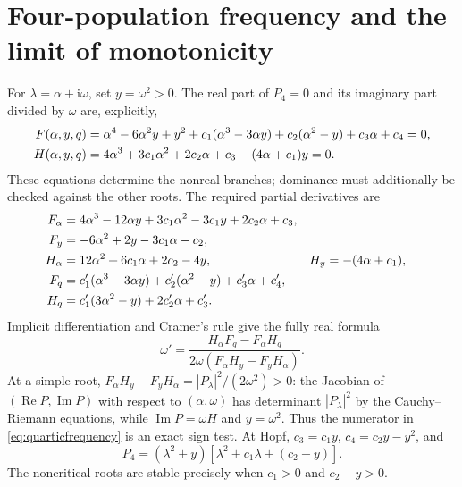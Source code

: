 \documentclass[11pt]{article}
\newcommand{\ii}{\mathrm i}
\newcommand{\Rea}{\operatorname{Re}}
\newcommand{\Ima}{\operatorname{Im}}
\begin{document}
\section{Four-population frequency and the limit of monotonicity}
For $\lambda=\alpha+\ii\omega$, set $y=\omega^2>0$. The real part of $P_4=0$
and its imaginary part divided by $\omega$ are, explicitly,
\begin{align}
 F(\alpha,y,q)&=\alpha^4-6\alpha^2y+y^2+c_1(\alpha^3-3\alpha y)
                  +c_2(\alpha^2-y)+c_3\alpha+c_4=0,\notag\\
 H(\alpha,y,q)&=4\alpha^3+3c_1\alpha^2+2c_2\alpha+c_3-(4\alpha+c_1)y=0.
 \label{eq:realimag}
\end{align}
These equations determine the nonreal branches; dominance must additionally
be checked against the other roots. The required partial derivatives are
\begin{align}
 F_\alpha&=4\alpha^3-12\alpha y+3c_1\alpha^2-3c_1y+2c_2\alpha+c_3,\notag\\
 F_y&=-6\alpha^2+2y-3c_1\alpha-c_2,\notag\\
 H_\alpha&=12\alpha^2+6c_1\alpha+2c_2-4y,&H_y&=-(4\alpha+c_1),\notag\\
 F_q&=c_1'(\alpha^3-3\alpha y)+c_2'(\alpha^2-y)+c_3'\alpha+c_4',\notag\\
 H_q&=c_1'(3\alpha^2-y)+2c_2'\alpha+c_3'.
\end{align}
Implicit differentiation and Cramer's rule give the fully real formula
\begin{equation}
 \boxed{\omega'=\frac{H_\alpha F_q-F_\alpha H_q}
 {2\omega(F_\alpha H_y-F_yH_\alpha)}}.
 \label{eq:quarticfrequency}
\end{equation}
At a simple root,
$F_\alpha H_y-F_yH_\alpha=|P_\lambda|^2/(2\omega^2)>0$:
the Jacobian of $(\Rea P,\Ima P)$ with respect to $(\alpha,\omega)$ has determinant
$|P_\lambda|^2$ by the Cauchy--Riemann equations, while $\Ima P=\omega H$ and
$y=\omega^2$. Thus the numerator in \eqref{eq:quarticfrequency} is an exact
sign test. At Hopf, $c_3=c_1y$, $c_4=c_2y-y^2$, and
\begin{equation}
 P_4=(\lambda^2+y)[\lambda^2+c_1\lambda+(c_2-y)].
\end{equation}
The noncritical roots are stable precisely when $c_1>0$ and $c_2-y>0$.
\end{document}
